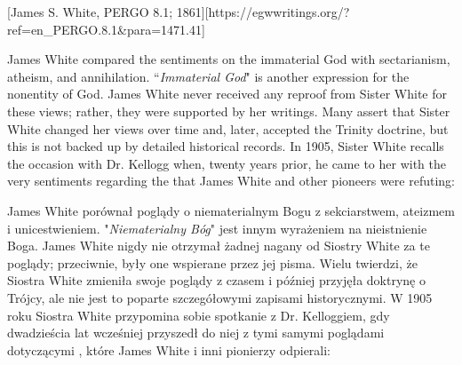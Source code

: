 [James S. White, PERGO 8.1; 1861][https://egwwritings.org/?ref=en\_PERGO.8.1&para=1471.41]


James White compared the sentiments on the immaterial God with sectarianism, atheism, and annihilation. “\textit{Immaterial God}" is another expression for the nonentity of God. James White never received any reproof from Sister White for these views; rather, they were supported by her writings. Many assert that Sister White changed her views over time and, later, accepted the Trinity doctrine, but this is not backed up by detailed historical records. In 1905, Sister White recalls the occasion with Dr. Kellogg when, twenty years prior, he came to her with the very sentiments regarding the  that James White and other pioneers were refuting:


James White porównał poglądy o niematerialnym Bogu z sekciarstwem, ateizmem i unicestwieniem. "\textit{Niematerialny Bóg}" jest innym wyrażeniem na nieistnienie Boga. James White nigdy nie otrzymał żadnej nagany od Siostry White za te poglądy; przeciwnie, były one wspierane przez jej pisma. Wielu twierdzi, że Siostra White zmieniła swoje poglądy z czasem i później przyjęła doktrynę o Trójcy, ale nie jest to poparte szczegółowymi zapisami historycznymi. W 1905 roku Siostra White przypomina sobie spotkanie z Dr. Kelloggiem, gdy dwadzieścia lat wcześniej przyszedł do niej z tymi samymi poglądami dotyczącymi , które James White i inni pionierzy odpierali:


